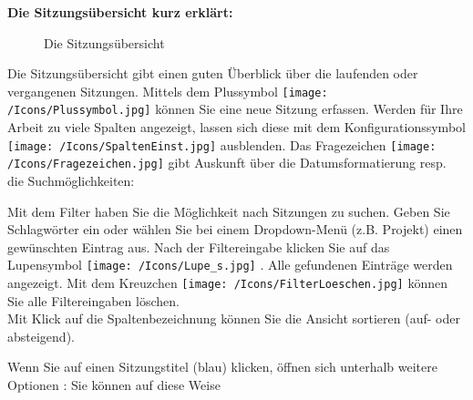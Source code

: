\pagebreak
\textbf{Die Sitzungsübersicht kurz erklärt:}

\begin{figure}[H]
\caption{Die Sitzungsübersicht}
\end{figure}

Die Sitzungsübersicht gibt einen guten Überblick über die laufenden oder vergangenen Sitzungen. Mittels dem Plussymbol \texttt{[image: /Icons/Plussymbol.jpg]}  können Sie eine neue Sitzung erfassen. Werden für Ihre Arbeit zu viele Spalten angezeigt, lassen sich diese mit dem Konfigurationssymbol \texttt{[image: /Icons/SpaltenEinst.jpg]}  ausblenden. Das Fragezeichen \texttt{[image: /Icons/Fragezeichen.jpg]}  gibt Auskunft über die Datumsformatierung resp. die Suchmöglichkeiten: 

\begin{figure}[H]
\end{figure}

Mit dem Filter haben Sie die Möglichkeit nach Sitzungen zu suchen. Geben Sie Schlagwörter ein oder wählen Sie bei einem Dropdown-Menü (z.B. Projekt) einen gewünschten Eintrag aus. Nach der Filtereingabe klicken Sie auf das Lupensymbol \texttt{[image: /Icons/Lupe\_s.jpg]} . Alle gefundenen Einträge werden angezeigt. Mit dem Kreuzchen \texttt{[image: /Icons/FilterLoeschen.jpg]}  können Sie alle Filtereingaben löschen. \\
Mit Klick auf die Spaltenbezeichnung können Sie die Ansicht sortieren (auf- oder absteigend).

Wenn Sie auf einen Sitzungstitel (blau) klicken, öffnen sich unterhalb weitere Optionen : Sie können auf diese Weise

